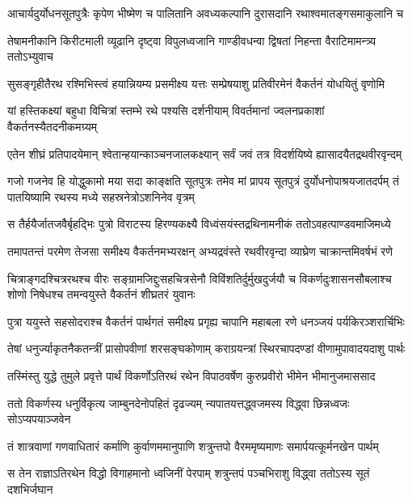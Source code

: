\twolineshloka
{आचार्यदुर्योधनसूतपुत्रैः कृपेण भीष्मेण च पालितानि}
{अवध्यकल्पानि दुरासदानि रथाश्वमातङ्गसमाकुलानि च}


\twolineshloka
{तेषामनीकानि किरीटमाली व्यूढानि दृष्ट्वा विपुलध्वजानि}
{गाण्डीवधन्वा द्विषतां निहन्ता वैराटिमामन्त्र्य ततोऽभ्युवाच}


\twolineshloka
{सुसङ्गृहीतैरथ रश्मिभिस्त्वं हयान्नियम्य प्रसमीक्ष्य यत्तः}
{सम्प्रेषयाशु प्रतिवीरमेनं वैकर्तनं योधयितुं वृणोमि}


\twolineshloka
{यां हस्तिकक्ष्यां बहुधा विचित्रां स्तम्भे रथे पश्यसि दर्शनीयाम्}
{विवर्तमानां ज्वलनप्रकाशां वैकर्तनस्यैतदनीकमग्र्यम्}


\twolineshloka
{एतेन शीघ्रं प्रतिपादयेमान् श्वेतान्हयान्काञ्चनजालकक्ष्यान्}
{सर्वं जवं तत्र विदर्शयिष्ये ह्यासादयैतद्रथवीरवृन्दम्}


\threelineshloka
{गजो गजनेव हि योद्धुकामो मया सदा काङ्क्षति सूतपुत्रः}
{तमेव मां प्रापय सूतपुत्रं दुर्योधनोपाश्रयजातदर्पम्}
{तं पातयिष्यामि रथस्य मध्ये सहस्रनेत्रोऽशनिनेव वृत्रम्}



\twolineshloka
{स तैर्हयैर्जातजवैर्बृहद्भिः पुत्रो विराटस्य हिरण्यकक्ष्यै}
{विध्वंसयंस्तद्रथिनामनीकं ततोऽवहत्पाण्डवमाजिमध्ये}


\twolineshloka
{तमापतन्तं परमेण तेजसा समीक्ष्य वैकर्तनमभ्यरक्षन्}
{अभ्यद्रवंस्ते रथवीरवृन्दा व्याघ्रेण चाक्रान्तमिवर्षभं रणे}


\threelineshloka
{चित्राङ्गदश्चित्ररथश्च वीरः सङ्ग्रामजिद्दुःसहचित्रसेनौ}
{विविंशतिर्दुर्मुखदुर्जयौ च विकर्णदुःशासनसौबलाश्च}
{शोणो निषेधश्च तमन्वयुस्ते वैकर्तनं शीघ्रतरं युवानः}


\twolineshloka
{पुत्रा ययुस्ते सहसोदराश्च वैकर्तनं पार्थगतं समीक्ष्य}
{प्रगृह्य चापानि महाबला रणे धनञ्जयं पर्यकिरञ्शरार्चिभिः}


\twolineshloka
{तेषां धनुर्ज्याकृतनैकतन्त्रीं प्रासोपवीणां शरसङ्घकोणाम्}
{कराग्रयन्त्रां स्थिरचापदण्डां वीणामुपावादयदाशु पार्थः}


\twolineshloka
{तस्मिंस्तु युद्धे तुमुले प्रवृत्ते पार्थं विकर्णोऽतिरथं रथेन}
{विपाठवर्षेण कुरुप्रवीरो भीमेन भीमानुजमाससाद}


\twolineshloka
{ततो विकर्णस्य धनुर्विकृत्य जाम्बुनदेनोपहितं दृढज्यम्}
{न्यपातयत्तद्ध्वजमस्य विद्ध्वा छिन्नध्वजः सोऽप्यपयाञ्जवेन}


\twolineshloka
{तं शात्रवाणां गणवाधितारं कर्माणि कुर्वाणममानुपाणि}
{शत्रुन्तपो वैरममृष्यमाणः समार्पयत्कूर्मनखेन पार्थम्}


\twolineshloka
{स तेन राज्ञाऽतिरथेन विद्धो विगाहमानो ध्वजिनीं पेरपाम्}
{शत्रुन्तपं पञ्चभिराशु विद्ध्वा ततोऽस्य सूतं दशभिर्जघान}


